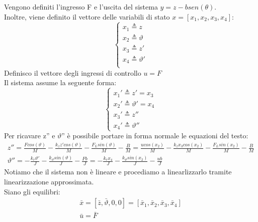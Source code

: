 Vengono definiti l'ingresso F e l’uscita del sistema $y=z-bsen(\theta)$. \\Inoltre, viene definito il vettore delle variabili di stato $x=[x_1,x_2,x_3,x_4]$:
\begin{displaymath}
\left\{
\begin{array}{l}
x_{1}\triangleq z \\ 
x_{2}\triangleq \vartheta \\ 
x_{3}\triangleq z' \\
x_{4}\triangleq \vartheta'\\
\end{array}
\right.
\end{displaymath}
Definisco il vettore degli ingressi di controllo $u=F$ \\
Il sistema assume la seguente forma:
\begin{displaymath}
\left\{
\begin{array}{l}
x_{1}'\triangleq z'=x_3 \\
x_{2}'\triangleq \vartheta' = x_4 \\
x_{3}'\triangleq z'' \\
x_{4}'\triangleq\vartheta''
\end{array}
\right.
\end{displaymath}
Per ricavare z'' e $\vartheta$'' è possibile portare in forma normale le equazioni del testo:
\begin{displaymath}
\begin{array}{l}
z''=\frac{Fcos(\vartheta)}{M}-\frac{k_{z}z'cos(\vartheta)}{M}-\frac{F_{L}sin(\vartheta)}{M}-\frac{B}{M}=\frac{ucos(x_2)}{M}-\frac{k_{z}x_3cos(x_2)}{M}-\frac{F_Lsin(x_2)}{M}-\frac{B}{M} \\
\vartheta''=-\frac{k_{r}\vartheta'}{J}-\frac{k_{\vartheta}sin(\vartheta)}{J}-\frac{Fb}{J}=-\frac{k_{r}x_{4}}{J}-\frac{k_{\vartheta}sin(x_2)}{J}-\frac{ub}{J}
\end{array}
\end{displaymath}
Notiamo che il sistema non è lineare e procediamo a linearlizzarlo tramite linearizzazione approssimata. \\
Siano gli equilibri:
\begin{displaymath}
\begin{array}{c}
\bar x = [\bar z,\bar\vartheta,0,0] = [\bar x_1,\bar x_2,\bar x_3,\bar x_4] \\
\bar u = \bar F
\end{array}
\end{displaymath}

